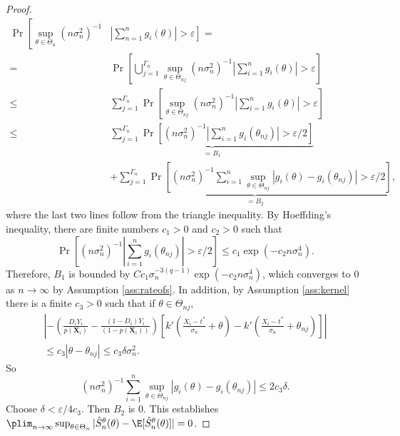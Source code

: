 {\begin{proof}
        \begin{align}
        \operatorname{Pr}\left[ \sup _{\theta \in \Theta_n}\left(n \sigma_n^2\right)^{-1} \right. & \left. \left|\sum_{n=1}^n g_{i}(\theta)\right|>\varepsilon\right] = \\
        = & \operatorname{Pr}\left[\bigcup_{j=1}^{\Gamma_n} \sup _{\theta \in \Theta_{nj}}\left(n \sigma_n^2\right)^{-1}\left|\sum_{i=1}^n g_{i}(\theta)\right|>\varepsilon\right] \\
        \leqslant & \sum_{j=1}^{\Gamma_n} \operatorname{Pr}\left[\sup _{\theta \in \Theta_{nj}}\left(n \sigma_n^2\right)^{-1}\left|\sum_{i=1}^n g_{i}(\theta)\right|>\varepsilon\right] \\
        \leqslant & \underbrace{\sum_{j=1}^{\Gamma_n} \operatorname{Pr}\left[\left(n \sigma_n^2\right)^{-1}\left|\sum_{i=1}^n g_{i}\left(\theta_{nj}\right)\right|>\varepsilon / 2\right]}_{=B_1} \\
        & + \underbrace{ \sum_{j=1}^{\Gamma_n} \operatorname{Pr}\left[\left(n \sigma_n^2\right)^{-1} \sum_{i=1}^n \sup _{\theta \in \Theta_{nj}}\left|g_{i}(\theta)-g_{i}\left(\theta_{nj}\right)\right|>\varepsilon / 2\right]}_{=B_2},
        \end{align}
        where the last two lines follow from the triangle inequality. By Hoeffding's inequality, there are finite numbers $c_1>0$ and $c_2>0$ such that
        $$
        \operatorname{Pr}\left[\left(n \sigma_n^2\right)^{-1}\left|\sum_{i=1}^n g_{i}\left(\theta_{nj}\right)\right|>\varepsilon / 2\right] \leqslant c_1 \exp \left(-c_2 n \sigma_n^4\right) .
        $$
        Therefore, $B_1$ is bounded by $C c_1 \sigma_n^{-3(q-1)} \exp \left(-c_2 n \sigma_n^4\right)$, which converges to 0 as $n \rightarrow \infty$ by Assumption \ref{ass:rateofs}. In addition, by Assumption \ref{ass:kernel} there is a finite $c_3>0$ such that if $\theta \in \Theta_{nj}$,
        \begin{gather}
        \left| -\left(\frac{D_i Y_i}{p(\textbf{X}_i)} - \frac{(1-D_i) Y_i}{(1-p(\textbf{X}_i))} \right) \left[k'\left(\frac{X_i - t^*}{\sigma_n} + \theta \right) - k'\left(\frac{X_i - t^*}{\sigma_n} + \theta_{nj} \right) \right]\right| \\
        \leqslant c_3\left|\theta-\theta_{nj}\right| \leqslant c_3 \delta \sigma_n^2 .
        \end{gather}
        So
        $$
        \left(n \sigma_n^2\right)^{-1} \sum_{i=1}^n \sup _{\theta \in \Theta_{n j}}\left|g_{i}(\theta)-g_{i}\left(\theta_{nj}\right)\right| \leqslant 2 c_3 \delta .
        $$
        Choose $\delta<\varepsilon / 4 c_3$. Then $B_2$ is 0. This establishes $\plim_{n \rightarrow \infty}  \sup_{\theta\in \Theta_n} |\hat{S}^\theta_n(\theta) - \E[\hat{S}^\theta_n(\theta)]| = 0$.


\end{proof}}
